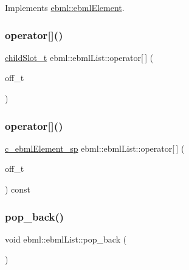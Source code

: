 Implements \mbox{\hyperlink{classebml_1_1ebmlElement_a7852173aeef78bd843939ae5a82f1d1c}{ebml\+::ebml\+Element}}.

\mbox{\label{classebml_1_1ebmlList_a93db5aabab62f6761162e2add92cdda7}} 
\subsubsection{\texorpdfstring{operator[]()}{operator[]()}\hspace{0.1cm}{\footnotesize\ttfamily [1/2]}}
{\footnotesize\ttfamily \mbox{\hyperlink{classebml_1_1childSlot__t}{child\+Slot\+\_\+t}} ebml\+::ebml\+List\+::operator\mbox{[}$\,$\mbox{]} (\begin{DoxyParamCaption}\item[{off\+\_\+t}]{ }\end{DoxyParamCaption})}

\mbox{\label{classebml_1_1ebmlList_ad1960e8d6774b85ab02b86981a661196}} 
\subsubsection{\texorpdfstring{operator[]()}{operator[]()}\hspace{0.1cm}{\footnotesize\ttfamily [2/2]}}
{\footnotesize\ttfamily \mbox{\hyperlink{namespaceebml_a2deef4e8071531b32e3533f1bf978917}{c\+\_\+ebml\+Element\+\_\+sp}} ebml\+::ebml\+List\+::operator\mbox{[}$\,$\mbox{]} (\begin{DoxyParamCaption}\item[{off\+\_\+t}]{ }\end{DoxyParamCaption}) const}

\mbox{\label{classebml_1_1ebmlList_a02685f24e74011cb4798467e7041c472}} 
\subsubsection{\texorpdfstring{pop\+\_\+back()}{pop\_back()}}
{\footnotesize\ttfamily void ebml\+::ebml\+List\+::pop\+\_\+back (\begin{DoxyParamCaption}{ }\end{DoxyParamCaption})}


